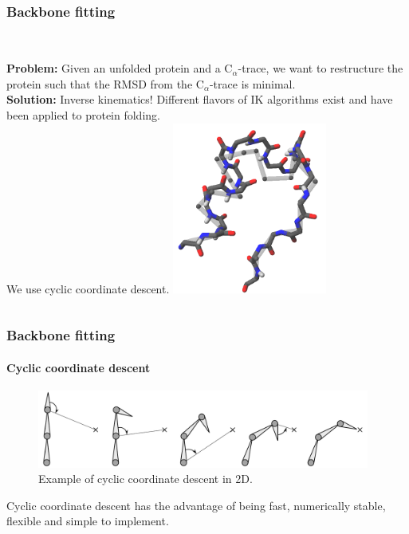 \documentclass{beamer}
\begin{document}
\subsection*{}
\begin{frame}[t, fragile]
  \frametitle{Backbone fitting} 
\begin{columns}[c]
\column{2.3in}
\\\vspace*{4mm}
\textbf{Problem:} Given an unfolded protein and a C$_\alpha$-trace, we want to restructure the protein such that the RMSD from the C$_\alpha$-trace is minimal.
\\\vspace*{4mm}
\textbf{Solution:} Inverse kinematics! Different flavors of IK algorithms exist and have been applied to protein folding.
\\\vspace*{8mm}
We use cyclic coordinate descent.
\column{2in}
	\vspace*{-3.2mm}
	\includegraphics[width=2in]{../rapport/figures/forside.png}
\end{columns}
\end{frame}

\begin{frame}[t, fragile]
\frametitle{Backbone fitting} 
\framesubtitle{Cyclic coordinate descent}
\begin{figure}
	\centering
	\includegraphics[width=4.3in]{ccd2d}
	\caption{Example of cyclic coordinate descent in 2D.}
\end{figure}
\vspace*{2mm}
Cyclic coordinate descent has the advantage of being fast, numerically stable, flexible and simple to implement.
\end{frame}
\end{document}
